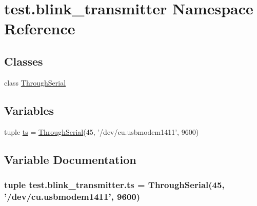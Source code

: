 \hypertarget{namespacetest_1_1blink__transmitter}{\section{test.\-blink\-\_\-transmitter Namespace Reference}
\label{namespacetest_1_1blink__transmitter}
}
\subsection*{Classes}
\begin{DoxyCompactItemize}
\item 
class \hyperlink{classtest_1_1blink__transmitter_1_1ThroughSerial}{Through\-Serial}
\end{DoxyCompactItemize}
\subsection*{Variables}
\begin{DoxyCompactItemize}
\item 
tuple \hyperlink{namespacetest_1_1blink__transmitter_a2a0ee5fa57549120daa438a1f3052082}{ts} = \hyperlink{classtest_1_1blink__transmitter_1_1ThroughSerial}{Through\-Serial}(45, '/dev/cu.\-usbmodem1411', 9600)
\end{DoxyCompactItemize}


\subsection{Variable Documentation}
\hypertarget{namespacetest_1_1blink__transmitter_a2a0ee5fa57549120daa438a1f3052082}{
\subsubsection[{ts}]{\setlength{\rightskip}{0pt plus 5cm}tuple test.\-blink\-\_\-transmitter.\-ts = {\bf Through\-Serial}(45, '/dev/cu.\-usbmodem1411', 9600)}}\label{namespacetest_1_1blink__transmitter_a2a0ee5fa57549120daa438a1f3052082}
